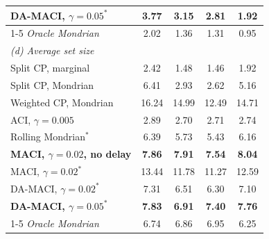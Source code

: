 \begin{table}[!htbp]
\begin{tabular}{lcccc}
\textbf{DA-MACI, $\gamma=0.05^{\ast}$} & \textbf{3.77} & \textbf{3.15} & \textbf{2.81} & \textbf{1.92}\\
\cmidrule(l){1-5}
\emph{Oracle Mondrian} & 2.02 & 1.36 & 1.31 & 0.95\\
\midrule
\multicolumn{5}{l}{\emph{(d) Average set size}}\\
Split CP, marginal & 2.42 & 1.48 & 1.46 & 1.92\\
Split CP, Mondrian & 6.41 & 2.93 & 2.62 & 5.16\\
Weighted CP, Mondrian & 16.24 & 14.99 & 12.49 & 14.71\\
ACI, $\gamma=0.005$ & 2.89 & 2.70 & 2.71 & 2.74\\
Rolling Mondrian$^{\ast}$ & 6.39 & 5.73 & 5.43 & 6.16\\
\textbf{MACI, $\gamma=0.02$, no delay} & \textbf{7.86} & \textbf{7.91} & \textbf{7.54} & \textbf{8.04}\\
MACI, $\gamma=0.02^{\ast}$ & 13.44 & 11.78 & 11.27 & 12.59\\
DA-MACI, $\gamma=0.02^{\ast}$ & 7.31 & 6.51 & 6.30 & 7.10\\
\textbf{DA-MACI, $\gamma=0.05^{\ast}$} & \textbf{7.83} & \textbf{6.91} & \textbf{7.40} & \textbf{7.76}\\
\cmidrule(l){1-5}
\emph{Oracle Mondrian} & 6.74 & 6.86 & 6.95 & 6.25\\
\bottomrule
\end{tabular}
\end{table}
